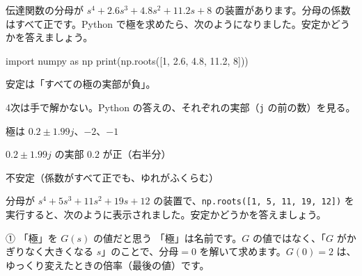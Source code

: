 \begin{reidai}
伝達関数の分母が $s^4+2.6s^3+4.8s^2+11.2s+8$ の装置があります。分母の係数はすべて正です。Python で極を求めたら、次のようになりました。安定かどうかを答えましょう。
\begin{bkcode}[Python]
import numpy as np
print(np.roots([1, 2.6, 4.8, 11.2, 8]))
\end{bkcode}
\begin{bkcodeout}[実行結果]
[ 0.2+1.98997487j  0.2-1.98997487j
 -2. +0.j         -1. +0.j        ]
\end{bkcodeout}
\kangaekata {}\par
{}\enspace 安定は「すべての極の実部が負」。\par
{}\enspace 4次は手で解かない。Python の答えの、それぞれの実部（\texttt{j} の前の数）を見る。\par
\shiki\kixjs{}\zw{} 極は $0.2\pm1.99j$、$-2$、$-1$\par
\kixja $0.2\pm1.99j$ の実部 $0.2$ が正（右半分）\par
\kotae\kixjs{}\zw{} 不安定（係数がすべて正でも、ゆれがふくらむ）
\end{reidai}

\begin{jibun}
分母が $s^4+5s^3+11s^2+19s+12$ の装置で、\texttt{np.roots([1, 5, 11, 19, 12])} を実行すると、次のように表示されました。安定かどうかを答えましょう。
\begin{bkcodeout}[実行結果]
[-3. +0.j         -0.5+1.93649167j
 -0.5-1.93649167j -1. +0.j        ]
\end{bkcodeout}
\end{jibun}


\begin{tsumazuki}{① 「極」を $G(s)$ の値だと思う}
「極」は名前です。$G$ の値ではなく、「$G$ がかぎりなく大きくなる $s$」のことで、分母$=0$ を解いて求めます。$G(0)=2$ は、ゆっくり変えたときの倍率（最後の値）です。
\end{tsumazuki}

